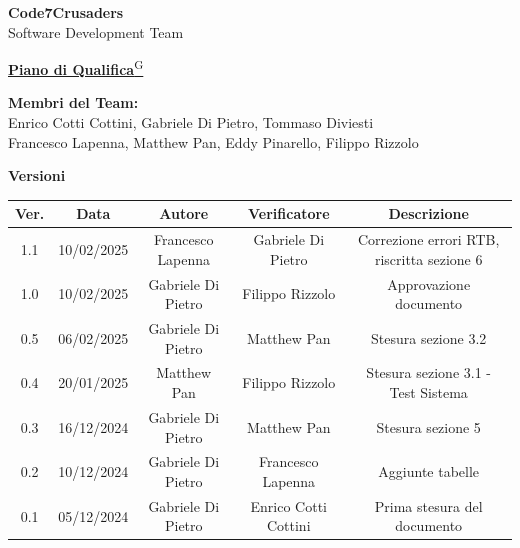 \documentclass{article}
\begin{document}
\begin{titlepage}
    {\Huge \textbf{Code7Crusaders}}\\
    \vspace{0.5cm}
    {\Large Software Development Team}\\
    \vspace{2cm}
    
    {\large \href{https://code7crusaders.github.io/docs/PB/documentazione_interna/glossario.html#piano-di-progetto}{\textbf{Piano di Qualifica}\textsuperscript{G}}}\\
    \vspace{5cm}
    
    
    \textbf{Membri del Team:}\\
    Enrico Cotti Cottini, Gabriele Di Pietro, Tommaso Diviesti \\
    Francesco Lapenna, Matthew Pan, Eddy Pinarello, Filippo Rizzolo \\
    \vspace{0.5cm}
    
    \vspace{1cm}
\end{titlepage}



\begin{table}[h!]
\centering
\textbf{Versioni} \\ %
\vspace{2mm} %
\begin{tabular}{|c|c|c|c|c|}
    \hline
    \textbf{Ver.} & \textbf{Data} & \textbf{Autore} & \textbf{Verificatore} & \textbf{Descrizione} \\
    \hline
    1.1 & 10/02/2025 & Francesco Lapenna & Gabriele Di Pietro & Correzione errori RTB, riscritta sezione 6 \\
    1.0 & 10/02/2025 & Gabriele Di Pietro & Filippo Rizzolo & Approvazione documento \\
    0.5 & 06/02/2025 & Gabriele Di Pietro & Matthew Pan & Stesura sezione 3.2 \\
    0.4 & 20/01/2025 & Matthew Pan & Filippo Rizzolo & Stesura sezione 3.1 - Test Sistema \\
    0.3 & 16/12/2024 & Gabriele Di Pietro & Matthew Pan & Stesura sezione 5 \\
    0.2 & 10/12/2024 & Gabriele Di Pietro & Francesco Lapenna & Aggiunte tabelle \\
    0.1 & 05/12/2024 & Gabriele Di Pietro & Enrico Cotti Cottini & Prima stesura del documento \\  
    \hline
\end{tabular}
\label{tab:versioni}
\end{table}
\newpage
\end{document}
